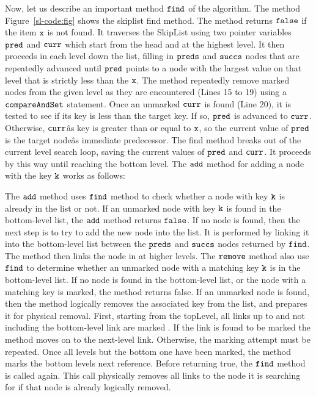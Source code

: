 Now, let us describe an important method $\tt find$ of the algorithm. The method   Figure~\ref{sl-code:fig} shows the skiplist find method.
The method returns $\tt false$ if the item  $\tt x$ is not found. It traverses the SkipList using two pointer variables $\tt pred$ and $\tt curr$ which start from the head and at the highest level. It then proceeds in each level down the list, filling in $\tt preds$
and $\tt succs$ nodes that are repeatedly advanced until $\tt pred$ points to a node with
the largest value on that level that is strictly less than the $\tt x$. The method repeatedly remove marked nodes from the
given level as they are encountered (Lines 15 to 19) using a $\tt compareAndSet$ statement. Once an unmarked $\tt curr$ is found (Line 20), it is
tested to see if its key is less than the target key. If so, $\tt pred$ is advanced to $\tt curr$. Otherwise, $\tt curr$âs key is greater than or equal to $\tt x$, so the current value
of $\tt pred$ is the target nodeâs immediate predecessor. The find method breaks
out of the current level search loop, saving the current values of $\tt pred$ and $\tt curr$. It proceeds by this way until reaching the bottom level. The $\tt add$ method for adding a node with the key $\tt k$ works as follows: 





The $\tt add$ method uses $\tt find$ method to check whether a node with key $\tt k$ is already in the list or not. If an unmarked node with key $\tt k$ is found in the bottom-level list, the $\tt add$ method returns $\tt false$. If no node is found, then the next step is to try to add the new node into the list. It is performed by linking it into the bottom-level list between the $\tt preds$ and $\tt succs$ nodes returned by $\tt find$. The method then links the node in at higher levels. 
The $\tt remove$ method also use $\tt find$ to determine whether an unmarked node with a matching key $\tt k$ is in the bottom-level list. If no node is found in the bottom-level list, or the node with a matching key is marked, the method returns false. If an unmarked node is found, then the method logically removes the associated key from the list, and prepares it for physical removal. First, starting from the topLevel, all links up to and not including the bottom-level link are marked . If the link is found to be marked the method moves on to the next-level link. Otherwise, the marking attempt must be repeated. Once all levels but the bottom one have been marked, the method marks the bottom levels next reference. Before returning true, the $\tt find$ method is called again. This call physically removes all links to the node it is searching for if that node is already logically removed.

